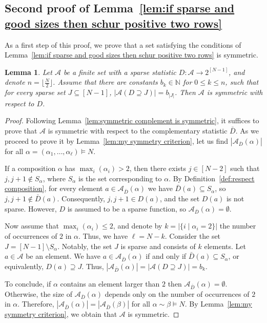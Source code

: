 \documentclass[11pt]{article}
\newtheorem{lemma}[theo]{Lemma}
\theoremstyle{definition}
\numberwithin{equation}{section}
\newcommand{\NN}{\mathbb{N}}
\newcommand{\A}{\mathcal{A}}
\begin{document}
\subsection{Second proof of Lemma~\ref{lem:if sparse and good sizes then schur positive two rows}}
\label{subsec:proof if sparse and good sizes then schur positive two rows by superstandard}
As a first step of this proof, we prove that a set satisfying the conditions of Lemma~\ref{lem:if sparse and good sizes then schur positive two rows} is symmetric.
\begin{lemma}
\label{lem:sufficent condition symmetry two rows}
    Let $\A$ be a finite set with a sparse statistic $D:\A \to 2^{[N-1]}$, and denote $n = \lfloor\frac{N}{2} \rfloor$. Assume that there are constants $b_k \in \NN$ for $0 \le k \le n$, such that for every sparse set $J \subseteq [N-1]$, $|\A(D \supseteq J)| = b_{|J|}$.
    Then $\A$ is symmetric with respect to $D$.
\end{lemma}
\begin{proof}
    Following Lemma~\ref{lem:symmetric complement is symmetric}, it suffices to prove that $\A$ is symmetric with respect to the complementary statistic $\bar{D}$. As we proceed to prove it by Lemma~\ref{lem:my symmetry criterion}, let us find $|\A_{\bar{D}}(\alpha)|$ for all $\alpha = (\alpha_1, \dots, \alpha_\ell) \vDash N$.
    
    If a composition $\alpha$ has $\max_i (\alpha_i) > 2$, 
    then there exists $j \in [N-2]$ such that $j,j+1 \notin S_\alpha$, where $S_\alpha$ is the set corresponding to $\alpha$. By Definition~\ref{def:respect composition}, for every element $a \in \A_{\bar{D}}(\alpha)$ we have $\bar{D}(a) \subseteq S_\alpha$, so $j, j + 1 \notin \bar{D}(a)$. Consequently, $j,j+1 \in D(a)$, and the set $D(a)$ is not sparse. However,
    $D$ is assumed to be a sparse function, so $\A_{\bar{D}}(\alpha) = \emptyset$.
    
    Now assume that $\max_i (\alpha_i) \le 2$, and denote by $k = |\{i \mid \alpha_i = 2\}|$ the number of occurrences of $2$ in $\alpha$. Thus, we have $\ell = N - k$.
    Consider the set $J = [N-1] \setminus S_\alpha$. Notably, the set $J$ is sparse and consists of $k$ elements.
    Let $a \in \A$ be an element. We have $a \in \A_{\bar{D}}(\alpha)$ if and only if $\bar{D}(a) \subseteq S_\alpha$, or equivalently, $D(a) \supseteq J$. Thus, $|\A_{\bar{D}}(\alpha)| = |\A(D \supseteq J)| = b_k$.
    
    To conclude, if $\alpha$ contains an element larger than $2$ then $\A_{\bar{D}}(\alpha) = \emptyset$. Otherwise, the size of $\A_{\bar{D}}(\alpha)$ depends only on the number of occurrences of $2$ in $\alpha$. Therefore, $|\A_{\bar{D}}(\alpha)| = |\A_{\bar{D}}(\beta)|$ for all $\alpha \sim \beta \vDash N$. By Lemma~\ref{lem:my symmetry criterion}, we obtain that $\A$ is symmetric.
\end{proof}
\end{document}
